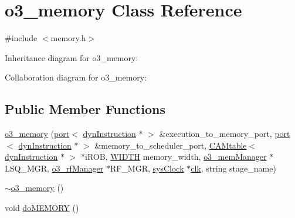\hypertarget{classo3__memory}{
\section{o3\_\-memory Class Reference}
\label{classo3__memory}
}


{\ttfamily \#include $<$memory.h$>$}



Inheritance diagram for o3\_\-memory:


Collaboration diagram for o3\_\-memory:
\subsection*{Public Member Functions}
\begin{DoxyCompactItemize}
\item 
\hyperlink{classo3__memory_a24a824f5299e113cbebf8765efa2ab6d}{o3\_\-memory} (\hyperlink{classport}{port}$<$ \hyperlink{classdynInstruction}{dynInstruction} $\ast$ $>$ \&execution\_\-to\_\-memory\_\-port, \hyperlink{classport}{port}$<$ \hyperlink{classdynInstruction}{dynInstruction} $\ast$ $>$ \&memory\_\-to\_\-scheduler\_\-port, \hyperlink{classCAMtable}{CAMtable}$<$ \hyperlink{classdynInstruction}{dynInstruction} $\ast$ $>$ $\ast$iROB, \hyperlink{global_2global_8h_a6fa2e24b8a418fa215e183264cbea3aa}{WIDTH} memory\_\-width, \hyperlink{classo3__memManager}{o3\_\-memManager} $\ast$LSQ\_\-MGR, \hyperlink{classo3__rfManager}{o3\_\-rfManager} $\ast$RF\_\-MGR, \hyperlink{classsysClock}{sysClock} $\ast$\hyperlink{g__objs_8h_afc4784c140eed1743728e83840e91c12}{clk}, string stage\_\-name)
\item 
\hyperlink{classo3__memory_a084e09aa6674090d325f82ce9a184fa3}{$\sim$o3\_\-memory} ()
\item 
void \hyperlink{classo3__memory_a7d5b76cef5e2ba2ee6cefc71fb59ee87}{doMEMORY} ()
\end{DoxyCompactItemize}


